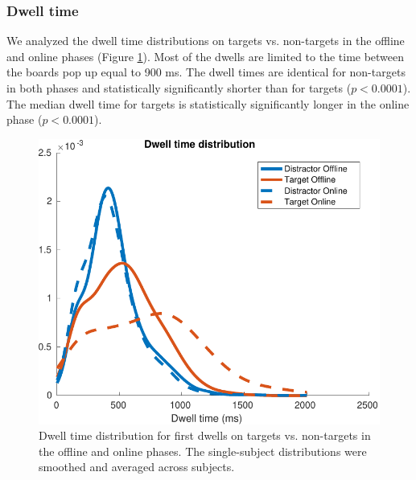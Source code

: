 \documentclass[12pt]{iopart}
\begin{document}
\subsubsection*{Dwell time}
We analyzed the dwell time distributions on targets vs. non-targets
in the offline and online phases (Figure \ref{fig:dwell}). 
Most of the dwells are limited to the time between the boards pop up equal to 900 ms.
The dwell times are identical for non-targets in both phases and statistically significantly
shorter than for targets ($p < 0.0001$).
The median dwell time for targets is statistically significantly longer in the online phase ($p < 0.0001$).

\begin{figure}[!t]
\center
    \includegraphics[trim={0cm 0cm 0cm 0cm},clip,width=0.6\columnwidth]{../images/DwelltimeDist_online_allmean.pdf}
    \caption{Dwell time distribution for first dwells on
    targets vs. non-targets in the offline and online phases. The single-subject
    distributions were smoothed and averaged across subjects.}
\label{fig:dwell}
\end{figure}
\end{document}
